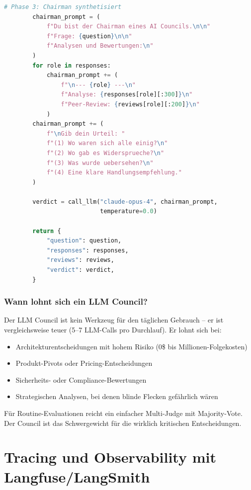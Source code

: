 \begin{lstlisting}[language=Python, caption=LLM Council mit anonymisierter Peer-Review]
        # Phase 3: Chairman synthetisiert
        chairman_prompt = (
            f"Du bist der Chairman eines AI Councils.\n\n"
            f"Frage: {question}\n\n"
            f"Analysen und Bewertungen:\n"
        )
        for role in responses:
            chairman_prompt += (
                f"\n--- {role} ---\n"
                f"Analyse: {responses[role][:300]}\n"
                f"Peer-Review: {reviews[role][:200]}\n"
            )
        chairman_prompt += (
            f"\nGib dein Urteil: "
            f"(1) Wo waren sich alle einig?\n"
            f"(2) Wo gab es Widersprueche?\n"
            f"(3) Was wurde uebersehen?\n"
            f"(4) Eine klare Handlungsempfehlung."
        )

        verdict = call_llm("claude-opus-4", chairman_prompt,
                           temperature=0.0)

        return {
            "question": question,
            "responses": responses,
            "reviews": reviews,
            "verdict": verdict,
        }
\end{lstlisting}

\subsubsection{Wann lohnt sich ein LLM Council?}

Der LLM Council ist kein Werkzeug für den täglichen Gebrauch -- er ist vergleichsweise teuer (5--7 LLM-Calls pro Durchlauf). Er lohnt sich bei:

\begin{itemize}[leftmargin=*]
    \item Architekturentscheidungen mit hohem Risiko (0\$ bis Millionen-Folgekosten)
    \item Produkt-Pivots oder Pricing-Entscheidungen
    \item Sicherheits- oder Compliance-Bewertungen
    \item Strategischen Analysen, bei denen blinde Flecken gefährlich wären
\end{itemize}

Für Routine-Evaluationen reicht ein einfacher Multi-Judge mit Majority-Vote. Der Council ist das Schwergewicht für die wirklich kritischen Entscheidungen.

\section{Tracing und Observability mit Langfuse/LangSmith}

